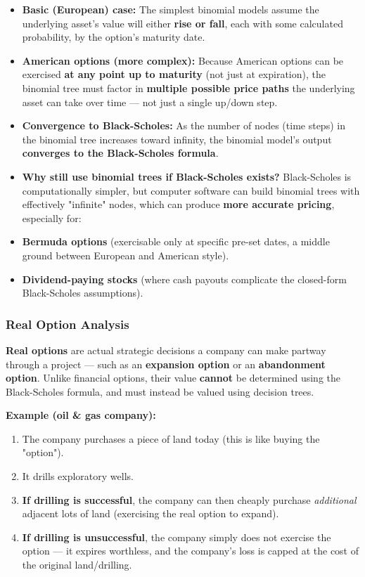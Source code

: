 \documentclass[12pt,openany]{book}
\begin{document}
\begin{itemize}[leftmargin=*]
    \item \textbf{Basic (European) case:} The simplest binomial models assume the underlying asset's value will either \textbf{rise or fall}, each with some calculated probability, by the option's maturity date.
    \item \textbf{American options (more complex):} Because American options can be exercised \textbf{at any point up to maturity} (not just at expiration), the binomial tree must factor in \textbf{multiple possible price paths} the underlying asset can take over time --- not just a single up/down step.
    \item \textbf{Convergence to Black-Scholes:} As the number of nodes (time steps) in the binomial tree increases toward infinity, the binomial model's output \textbf{converges to the Black-Scholes formula}.
    \item \textbf{Why still use binomial trees if Black-Scholes exists?} Black-Scholes is computationally simpler, but computer software can build binomial trees with effectively "infinite" nodes, which can produce \textbf{more accurate pricing}, especially for:
    \item \textbf{Bermuda options} (exercisable only at specific pre-set dates, a middle ground between European and American style).
    \item \textbf{Dividend-paying stocks} (where cash payouts complicate the closed-form Black-Scholes assumptions).
\end{itemize}


\subsubsection{Real Option Analysis}


\textbf{Real options} are actual strategic decisions a company can make partway through a project --- such as an \textbf{expansion option} or an \textbf{abandonment option}. Unlike financial options, their value \textbf{cannot} be determined using the Black-Scholes formula, and must instead be valued using decision trees.

\textbf{Example (oil \& gas company):}
\begin{enumerate}[leftmargin=*]
    \item The company purchases a piece of land today (this is like buying the "option").
    \item It drills exploratory wells.
    \item \textbf{If drilling is successful}, the company can then cheaply purchase \textit{additional} adjacent lots of land (exercising the real option to expand).
    \item \textbf{If drilling is unsuccessful}, the company simply does not exercise the option --- it expires worthless, and the company's loss is capped at the cost of the original land/drilling.

\end{enumerate}
\end{document}
